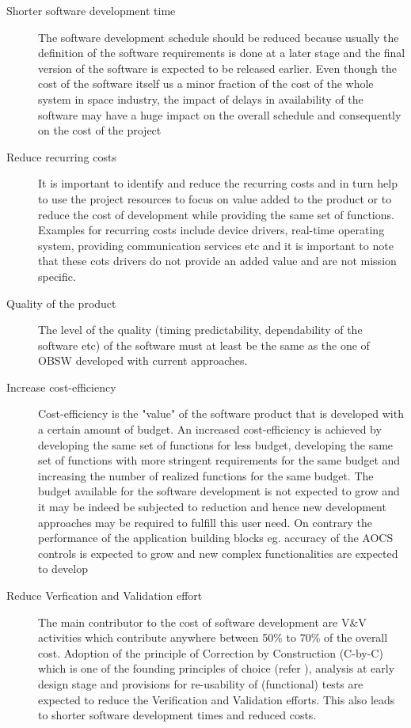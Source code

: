 \begin{description}
\item [Shorter software development time] The software development schedule should be reduced because usually the definition of the software requirements is done at a later stage and the final version of the software is expected to be released earlier. Even though the cost of the software itself us a minor fraction of the cost of the whole system in space industry, the impact of delays in availability of the software may have a huge impact on the overall schedule and consequently on the cost of the project

\item [Reduce recurring costs] It is important to identify and reduce the recurring costs and in turn help to use the project resources to focus on value added to the product or to reduce the cost of development while providing the same set of functions. Examples for recurring costs include device drivers, real-time operating system, providing communication services etc and it is important to note that these cots drivers do not provide an added value and are not mission specific.

\item [Quality of the product] The level of the quality (timing predictability, dependability of the software etc) of the software must at least be the same as the one of OBSW developed with current approaches.

\item [Increase cost-efficiency] Cost-efficiency is the "value" of the software product that is developed with a certain amount of budget. An increased cost-efficiency is achieved by developing the same set of functions for less budget, developing the same set of functions with more stringent requirements for the same budget and increasing the number of realized functions for the same budget. The budget available for the software development is not expected to grow and it may be indeed be subjected to reduction and hence new development approaches may be required to fulfill this user need. On contrary the performance of the application building blocks eg. accuracy of the AOCS controls is expected to grow and new complex functionalities are expected to develop

\item [Reduce Verfication and Validation effort] The main contributor to the cost of software development are V\&V activities which contribute anywhere between 50\% to 70\% of the overall cost. Adoption of the principle of Correction by Construction (C-by-C) which is one of the founding principles of choice (refer ), analysis at early design stage and provisions for re-usability of (functional) tests are expected to reduce the Verification and Validation efforts. This also leads to shorter software development times and reduced costs. 


\end{description}
